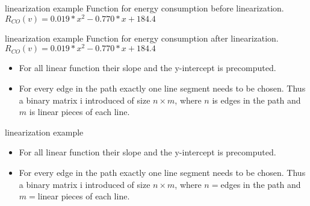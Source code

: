 \begin{frame}{linearization example}
Function for energy consumption before linearization. $R_{CO}(v)=0.019*x^2 - 0.770*x + 184.4$
\begin{figure}[!htb]
\label{fig:graph}
% 

\label{fig:graph}
\end{figure}
\end{frame}

\begin{frame}{linearization example}
Function for energy consumption after linearization. $R_{CO}(v)=0.019*x^2 - 0.770*x + 184.4$
\begin{figure}[!htb]
\label{fig:graph}
% 

\label{fig:graph}
\end{figure}
\begin{itemize}
\item For all linear function their slope and the y-intercept is precomputed. 
\item For every edge in the path exactly one line segment needs to be chosen. Thus a binary matrix i introduced of size $n \times m$, where $n$ is edges in the path and $m$ is linear pieces of each line. 
\end{itemize}
\end{frame}
\begin{frame}{linearization example}
\begin{itemize}
\item For all linear function their slope and the y-intercept is precomputed. 
\item For every edge in the path exactly one line segment needs to be chosen. Thus a binary matrix i introduced of size $n \times m$, where $n=$edges in the path and $m=$linear pieces of each line. 
\end{itemize}
\end{frame}




